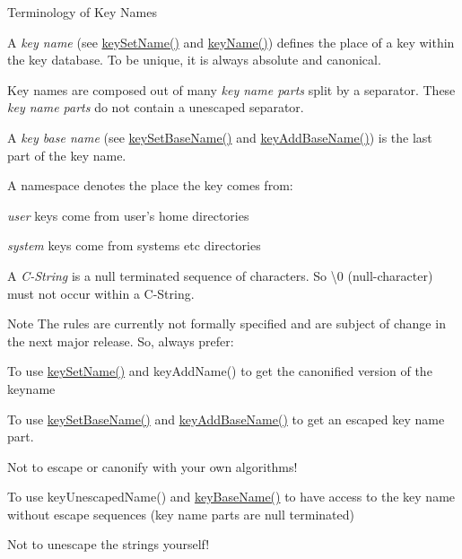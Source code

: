 \begin{DoxyParagraph}{Terminology of Key Names}

\begin{DoxyItemize}
\item A {\itshape key name} (see \hyperlink{group__keyname_ga7699091610e7f3f43d2949514a4b35d9}{key\-Set\-Name()} and \hyperlink{group__keyname_ga8e805c726a60da921d3736cda7813513}{key\-Name()}) defines the place of a key within the key database. To be unique, it is always absolute and canonical.
\item Key names are composed out of many {\itshape key name parts} split by a separator. These {\itshape key name parts} do not contain a unescaped separator.
\item A {\itshape key base name} (see \hyperlink{group__keyname_ga6e804bd453f98c28b0ff51430d1df407}{key\-Set\-Base\-Name()} and \hyperlink{group__keyname_gaa942091fc4bd5c2699e49ddc50829524}{key\-Add\-Base\-Name()}) is the last part of the key name.
\item A namespace denotes the place the key comes from\-:
\begin{DoxyItemize}
\item {\itshape user} keys come from user's home directories
\item {\itshape system} keys come from systems etc directories
\end{DoxyItemize}
\item A {\itshape C-\/\-String} is a null terminated sequence of characters. So \textbackslash{}0 (null-\/character) must not occur within a C-\/\-String.
\end{DoxyItemize}
\end{DoxyParagraph}
\begin{DoxyNote}{Note}
The rules are currently not formally specified and are subject of change in the next major release. So, always prefer\-:
\begin{DoxyItemize}
\item To use \hyperlink{group__keyname_ga7699091610e7f3f43d2949514a4b35d9}{key\-Set\-Name()} and key\-Add\-Name() to get the canonified version of the keyname
\item To use \hyperlink{group__keyname_ga6e804bd453f98c28b0ff51430d1df407}{key\-Set\-Base\-Name()} and \hyperlink{group__keyname_gaa942091fc4bd5c2699e49ddc50829524}{key\-Add\-Base\-Name()} to get an escaped key name part.
\item Not to escape or canonify with your own algorithms!
\item To use key\-Unescaped\-Name() and \hyperlink{group__keyname_gaaff35e7ca8af5560c47e662ceb9465f5}{key\-Base\-Name()} to have access to the key name without escape sequences (key name parts are null terminated)
\item Not to unescape the strings yourself!
\end{DoxyItemize}
\end{DoxyNote}
